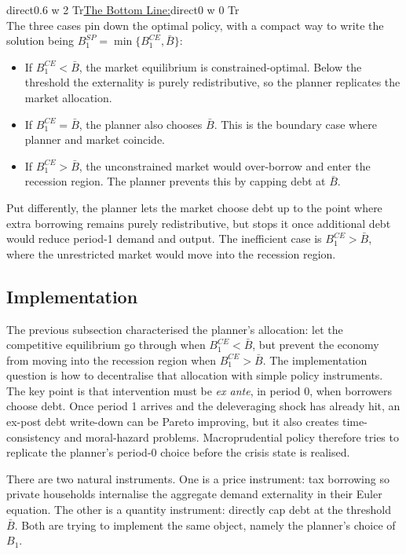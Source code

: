 \documentclass[11pt,a4paper]{article}
\DeclareRobustCommand{\hand}{%
\fontfamily{augie}\selectfont}
\newcommand{\handbold}[1]{{\hand\pdfliteral direct{0.6 w 2 Tr}#1\pdfliteral direct{0 w 0 Tr}}}
\begin{document}
\begin{notebox}
\handbold{\underline{The Bottom Line:}}\medskip\\
The three cases pin down the optimal policy, with a compact way to write the solution being $B_1^{SP}=\min\{B_1^{CE},\bar{B}\}$:
\begin{itemize}
    \item If $B_1^{CE}<\bar{B}$, the market equilibrium is constrained-optimal. Below the threshold the externality is purely redistributive, so the planner replicates the market allocation.
    \item If $B_1^{CE}=\bar{B}$, the planner also chooses $\bar{B}$. This is the boundary case where planner and market coincide.
    \item If $B_1^{CE}>\bar{B}$, the unconstrained market would over-borrow and enter the recession region. The planner prevents this by capping debt at $\bar{B}$.
\end{itemize}
Put differently, the planner lets the market choose debt up to the point where extra borrowing remains purely redistributive, but stops it once additional debt would reduce period-1 demand and output. The inefficient case is $B_1^{CE}>\bar{B}$, where the unrestricted market would move into the recession region.
\end{notebox}


\subsection{Implementation}

The previous subsection characterised the planner's allocation: let the competitive equilibrium go through when $B_1^{CE}<\bar{B}$, but prevent the economy from moving into the recession region when $B_1^{CE}>\bar{B}$. The implementation question is how to decentralise that allocation with simple policy instruments. The key point is that intervention must be \textit{ex ante}, in period 0, when borrowers choose debt. Once period 1 arrives and the deleveraging shock has already hit, an ex-post debt write-down can be Pareto improving, but it also creates time-consistency and moral-hazard problems. Macroprudential policy therefore tries to replicate the planner's period-0 choice before the crisis state is realised.

There are two natural instruments. One is a price instrument: tax borrowing so private households internalise the aggregate demand externality in their Euler equation. The other is a quantity instrument: directly cap debt at the threshold $\bar{B}$. Both are trying to implement the same object, namely the planner's choice of $B_1$.
\end{document}
